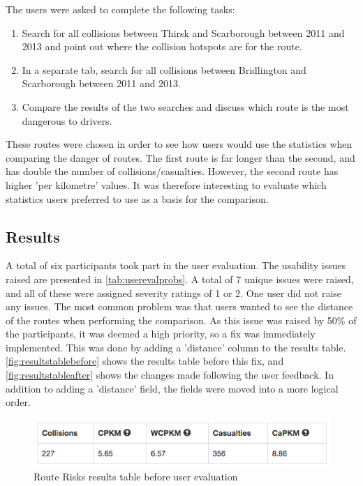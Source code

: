 \documentclass[authoryearcitations]{UoYCSproject}
\begin{document}
The users were asked to complete the following tasks:

\begin{enumerate}
	\item Search for all collisions between Thirsk and Scarborough between 2011 and 2013 and point out where the collision hotspots are for the route.
	\item In a separate tab, search for all collisions between Bridlington and Scarborough between 2011 and 2013.
	\item Compare the results of the two searches and discuss which route is the most dangerous to drivers.
\end{enumerate}

These routes were chosen in order to see how users would use the statistics when comparing the danger of routes. The first route is far longer than the second, and has double the number of collisions/casualties. However, the second route has higher 'per kilometre' values. It was therefore interesting to evaluate which statistics users preferred to use as a basis for the comparison.

\subsection{Results}

A total of six participants took part in the user evaluation. The usability issues raised are presented in \autoref{tab:userevalprobs}. A total of 7 unique issues were raised, and all of these were assigned severity ratings of 1 or 2. One user did not raise any issues. The most common problem was that users wanted to see the distance of the routes when performing the comparison. As this issue was raised by 50\% of the participants, it was deemed a high priority, so a fix was immediately implemented. This was done by adding a 'distance' column to the results table. \autoref{fig:resultstablebefore} shows the results table before this fix, and \autoref{fig:resultstableafter} shows the changes made following the user feedback. In addition to adding a 'distance' field, the fields were moved into a more logical order.

\begin{figure}
	\center
	\includegraphics[scale=0.75]{resultstablebefore}
	\caption{Route Risks results table before user evaluation}
	\label{fig:resultstablebefore}
\end{figure}
\end{document}
